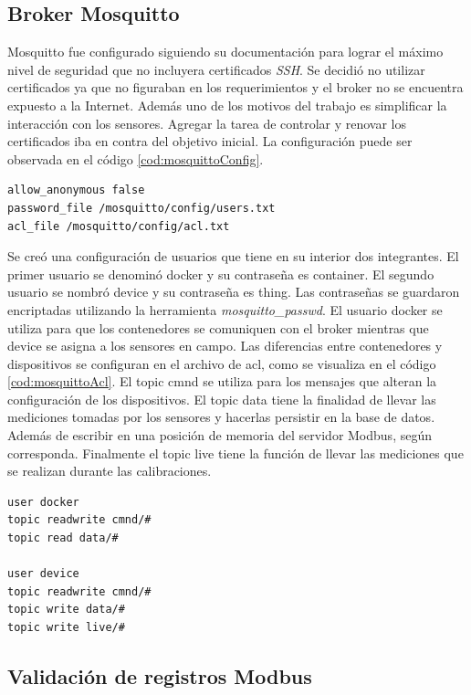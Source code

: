 \subsection{Broker Mosquitto}

Mosquitto fue configurado siguiendo su documentación para lograr el máximo nivel de seguridad que no incluyera certificados \emph{SSH}.
Se decidió no utilizar certificados ya que no figuraban en los requerimientos y el broker no se encuentra expuesto a la Internet.
Además uno de los motivos del trabajo es simplificar la interacción con los sensores.
Agregar la tarea de controlar y renovar los certificados iba en contra del objetivo inicial.
La configuración puede ser observada en el código \ref{cod:mosquittoConfig}.

\begin{lstlisting}[label=cod:mosquittoConfig,caption=Archivo mosquitto.conf]
allow_anonymous false
password_file /mosquitto/config/users.txt
acl_file /mosquitto/config/acl.txt
\end{lstlisting}

Se creó una configuración de usuarios que tiene en su interior dos integrantes.
El primer usuario se denominó docker y su contraseña es container.
El segundo usuario se nombró device y su contraseña es thing.
Las contraseñas se guardaron encriptadas utilizando la herramienta \emph{mosquitto\_passwd}.
El usuario docker se utiliza para que los contenedores se comuniquen con el broker mientras que device se asigna a los sensores en campo.
Las diferencias entre contenedores y dispositivos se configuran en el archivo de acl, como se visualiza en el código \ref{cod:mosquittoAcl}.
El topic cmnd se utiliza para los mensajes que alteran la configuración de los dispositivos.
El topic data tiene la finalidad de llevar las mediciones tomadas por los sensores y hacerlas persistir en la base de datos.
Además de escribir en una posición de memoria del servidor Modbus, según corresponda.
Finalmente el topic live tiene la función de llevar las mediciones que se realizan durante las calibraciones.

\begin{lstlisting}[label=cod:mosquittoAcl,caption=Lista de control de acceso]
user docker
topic readwrite cmnd/#
topic read data/#

user device
topic readwrite cmnd/#
topic write data/#
topic write live/#
\end{lstlisting}

\subsection{Validación de registros Modbus}

